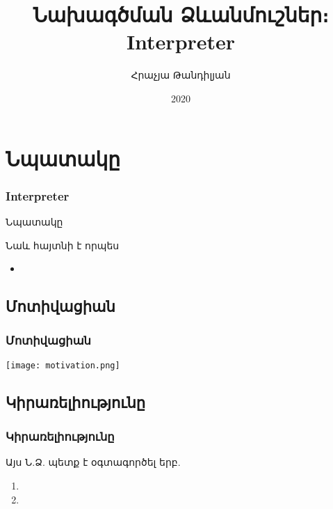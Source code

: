 \documentclass{beamer}
\begin{document}
\title[Interpreter]{Նախագծման Ձևանմուշներ։ Interpreter}
\author[Հրաչյա Թանդիլյան\copyright]{Հրաչյա Թանդիլյան}
\date{2020}

\begin{frame}
\titlepage
\end{frame}

\section{Նպատակը}
\begin{frame}\frametitle{Interpreter}
\begin{block}{Նպատակը}

\end{block}
\vfill
Նաև հայտնի է որպես
\begin{itemize}
    \item 
\end{itemize}
\end{frame}

\subsection{Մոտիվացիան}
\begin{frame}\frametitle{Մոտիվացիան}
\begin{center}
    \texttt{[image: motivation.png]}
\end{center}
\end{frame}

\subsection{Կիրառելիությունը}
\begin{frame}\frametitle{Կիրառելիությունը}
Այս Ն.Ձ. պետք է օգտագործել երբ.
\vfill
\begin{enumerate}
    \item  \pause \vfill
    \item
\end{enumerate}
\end{frame}
\end{document}
